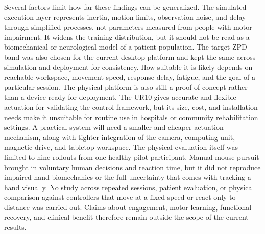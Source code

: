 \documentclass[letterpaper,journal]{IEEEtran}
\begin{document}
Several factors limit how far these findings can be generalized. The simulated execution layer represents inertia, motion limits, observation noise, and delay through simplified processes, not parameters measured from people with motor impairment. It widens the training distribution, but it should not be read as a biomechanical or neurological model of a patient population. The target ZPD band was also chosen for the current desktop platform and kept the same across simulation and deployment for consistency. How suitable it is likely depends on reachable workspace, movement speed, response delay, fatigue, and the goal of a particular session. The physical platform is also still a proof of concept rather than a device ready for deployment. The UR10 gives accurate and flexible actuation for validating the control framework, but its size, cost, and installation needs make it unsuitable for routine use in hospitals or community rehabilitation settings. A practical system will need a smaller and cheaper actuation mechanism, along with tighter integration of the camera, computing unit, magnetic drive, and tabletop workspace. The physical evaluation itself was limited to nine rollouts from one healthy pilot participant. Manual mouse pursuit brought in voluntary human decisions and reaction time, but it did not reproduce impaired hand biomechanics or the full uncertainty that comes with tracking a hand visually. No study across repeated sessions, patient evaluation, or physical comparison against controllers that move at a fixed speed or react only to distance was carried out. Claims about engagement, motor learning, functional recovery, and clinical benefit therefore remain outside the scope of the current results.
\end{document}
